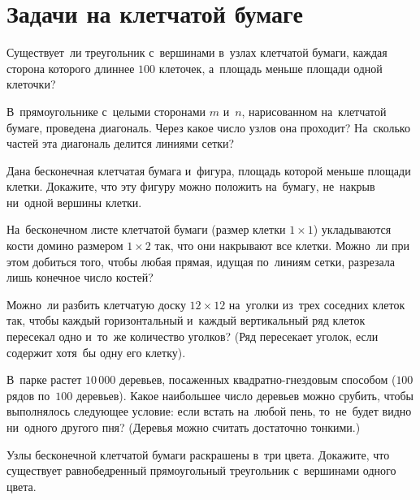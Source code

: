 
\section*{Задачи на клетчатой бумаге}


\begin{problems}

\item
Существует~ли треугольник с~вершинами в~узлах клетчатой бумаги, каждая сторона
которого длиннее $100$ клеточек, а~площадь меньше площади одной клеточки?

\item
В~прямоугольнике с~целыми сторонами $m$ и~$n$, нарисованном на~клетчатой
бумаге, проведена диагональ.
Через какое число узлов она проходит?
На~сколько частей эта диагональ делится линиями сетки?

\item
Дана бесконечная клетчатая бумага и~фигура, площадь которой меньше площади
клетки.
Докажите, что эту фигуру можно положить на~бумагу, не~накрыв ни~одной вершины
клетки.

\item
На~бесконечном листе клетчатой бумаги (размер клетки $1 \times 1$) укладываются
кости домино размером $1 \times 2$ так, что они накрывают все клетки.
Можно~ли при этом добиться того, чтобы любая прямая, идущая по~линиям сетки,
разрезала лишь конечное число костей?

\item
Можно~ли разбить клетчатую доску $12 \times 12$ на~уголки из~трех соседних
клеток так, чтобы каждый горизонтальный и~каждый вертикальный ряд клеток
пересекал одно и~то~же количество уголков?
(Ряд пересекает уголок, если содержит хотя~бы одну его клетку).

\item
В~парке растет $10\,000$ деревьев, посаженных квадратно-гнездовым способом
($100$ рядов по~$100$ деревьев).
Какое наибольшее число деревьев можно срубить, чтобы выполнялось следующее
условие: если встать на~любой пень, то~не~будет видно ни~одного другого пня?
(Деревья можно считать достаточно тонкими.)

\item
Узлы бесконечной клетчатой бумаги раскрашены в~три цвета.
Докажите, что существует равнобедренный прямоугольный треугольник с~вершинами
одного цвета.


\end{problems}
